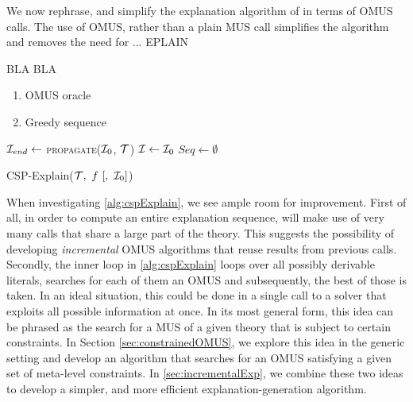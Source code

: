 
We now rephrase, and simplify the explanation algorithm of \citet{ecai/BogaertsGCG20} in terms of OMUS calls. The use of OMUS, rather than a plain MUS call simplifies the algorithm and removes the need for ... EPLAIN

BLA BLA 


\begin{enumerate}
    \item OMUS oracle
    \item Greedy sequence
\end{enumerate}

\begin{algorithm}
    \DontPrintSemicolon
    $\mathcal{I}_{end} \gets$ \textsc{propagate($\mathcal{I}_0$, $\mathcal{T}$)} \;
    $\mathcal{I} \gets \mathcal{I}_0$  \;
    $Seq \gets \emptyset$  \;
  \caption{CSP-Explain($\m{T} ,\ f \ [,  \ \m{I}_0 ]$)}
  \label{alg:cspExplain}
\end{algorithm}




When investigating \cref{alg:cspExplain}, we see ample room for improvement. 
First of all, in order to compute an entire explanation sequence, \label{alg:cspExplain} will make use of very many \omus calls that share a large part of the theory. 
This suggests the possibility of developing \emph{incremental} OMUS algorithms that reuse results from previous calls. 
Secondly, the inner loop in \cref{alg:cspExplain} loops over all possibly derivable  literals, searches for each of them an OMUS and subsequently, the best of those is taken. 
In an ideal situation, this could be done in a single call to a solver that exploits all possible information at once. 
In its most general form, this idea can be phrased as the search for a MUS of a given theory that is subject to certain constraints. 
In Section \ref{sec:constrainedOMUS}, we explore this idea in the generic setting and develop an algorithm that searches for an OMUS satisfying a given set of meta-level constraints. 
In \cref{sec:incrementalExp}, we combine these two ideas to develop a simpler, and more efficient explanation-generation algorithm. 
